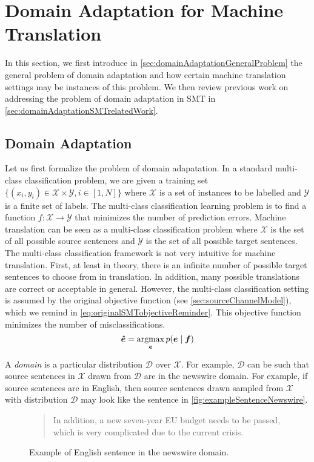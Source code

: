 \section{Domain Adaptation for Machine Translation}
\label{sec:domainAdaptationMT}

In this section, we first introduce in
\autoref{sec:domainAdaptationGeneralProblem} the general problem of domain
adaptation and how certain machine translation settings
may be instances of this problem. We then review
previous work on addressing the problem of domain adaptation
in SMT in \autoref{sec:domainAdaptationSMTrelatedWork}.

\subsection{Domain Adaptation}
\label{sec:domainAdaptationGeneralProblem}

Let us first formalize the problem of domain adapatation.
In a standard multi-class classification problem, we are
given a training set
$\{(x_i, y_i) \in \mathcal{X} \times \mathcal{Y}, i \in [1, N]\}$
where $\mathcal{X}$ is a set of instances to be labelled and
$\mathcal{Y}$ is a finite set of labels. The multi-class classification
learning problem
is to find a function $f : \mathcal{X} \rightarrow \mathcal{Y}$
that minimizes the number of prediction errors.
Machine translation
can be seen as a multi-class classification problem where $\mathcal{X}$
is the set of all possible source sentences and $\mathcal{Y}$ is the set of
all possible target sentences. The multi-class classification framework is not very intuitive
for machine translation. First, at least in theory, there is an
infinite number of possible target sentences to choose from in translation.
In addition, many possible translations are correct
or acceptable in general.
However, the multi-class classification setting is assumed by the original objective
function (see \autoref{sec:sourceChannelModel}), which we
remind in \autoref{eq:originalSMTobjectiveReminder}. This objective
function minimizes the number of misclassifications.
%
\begin{equation}
  \bm{\hat{e}} = \operatorname*{argmax}_{\bm{e}} p(\bm{e} \mid \bm{f})
  \label{eq:originalSMTobjectiveReminder}
\end{equation}
%

A \emph{domain} is a particular distribution $\mathcal{D}$
over $\mathcal{X}$. For example, $\mathcal{D}$ can be such that
source sentences in $\mathcal{X}$ drawn from $\mathcal{D}$ are
in the newswire
domain. For example, if source sentences are in English, then source sentences
drawn sampled from $\mathcal{X}$ with distribution $\mathcal{D}$
may look like
the sentence in \autoref{fig:exampleSentenceNewswire}.
%
\begin{figure}
  \begin{quote}
    In addition, a new seven-year EU budget needs to be passed, which is very complicated due to the current crisis.
  \end{quote}
  \caption{Example of English sentence in the newswire domain.}
  \label{fig:exampleSentenceNewswire}
\end{figure}
%

